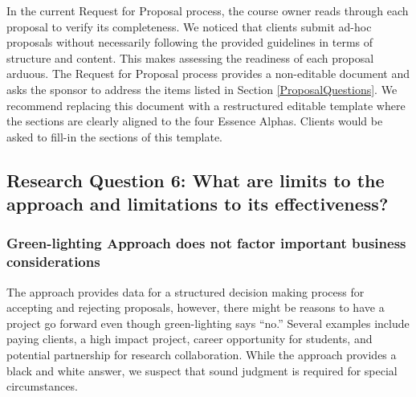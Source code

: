 \documentclass[conference]{IEEEtran}
\begin{document}

In the current Request for Proposal process, the course owner reads
through each proposal to verify its completeness. We noticed that
clients submit ad-hoc proposals without necessarily following the
provided guidelines in terms of structure and content. This makes
assessing the readiness of each proposal arduous. The Request for
Proposal process provides a non-editable document and asks the sponsor
to address the items listed in Section
\ref{ProposalQuestions}. We recommend replacing this
document with a restructured editable template where the sections are
clearly aligned to the four Essence Alphas. Clients would be asked to
fill-in the sections of this template. 


\subsection{Research Question 6: What are limits to
the approach and limitations to its effectiveness?}

\subsubsection{Green-lighting Approach does not factor important business considerations}
The approach provides data for a structured decision making process for
accepting and rejecting proposals, however, there might be reasons to
have a project go forward even though green-lighting says ``no.''
Several examples include paying clients, a high impact project, career
opportunity for students, and potential partnership for research
collaboration. While the approach provides a black and white answer,
we suspect that sound judgment is required for special circumstances.
\end{document}
